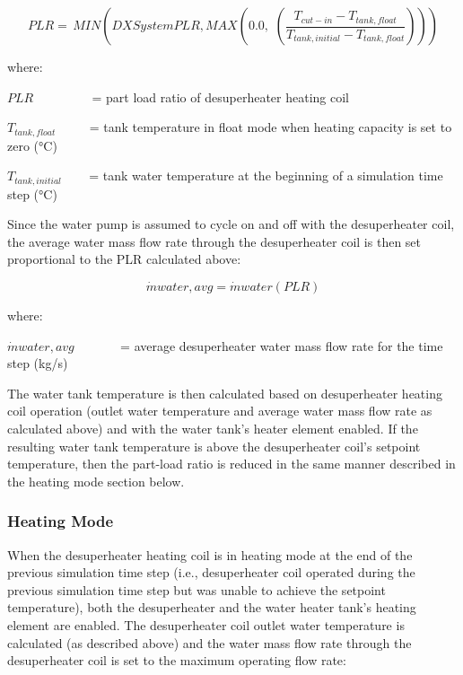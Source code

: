 \begin{equation}
PLR = \,MIN\left( {DXSystemPLR,MAX\left( {0.0,\,\,\left( {\frac{{{T_{cut - in}} - {T_{tank,float}}}}{{{T_{tank,initial}} - {T_{tank,float}}}}} \right)} \right)} \right)
\end{equation}

where:

\(PLR\) ~~~~~~~~ = part load ratio of desuperheater heating coil

\({T_{tank,float}}\) ~~~~ = tank temperature in float mode when heating capacity is set to zero (°C)

\({T_{tank,initial}}\) ~~~ = tank water temperature at the beginning of a simulation time step (°C)

Since the water pump is assumed to cycle on and off with the desuperheater coil, the average water mass flow rate through the desuperheater coil is then set proportional to the PLR calculated above:

\begin{equation}
\dot mwater,avg = \dot mwater\left( {PLR} \right)
\end{equation}

where:

\(\dot mwater,avg\) ~~~~~~ = average desuperheater water mass flow rate for the time step (kg/s)

The water tank temperature is then calculated based on desuperheater heating coil operation (outlet water temperature and average water mass flow rate as calculated above) and with the water tank's heater element enabled. If the resulting water tank temperature is above the desuperheater coil's setpoint temperature, then the part-load ratio is reduced in the same manner described in the heating mode section below.

\subsubsection{Heating Mode}\label{heating-mode}

When the desuperheater heating coil is in heating mode at the end of the previous simulation time step (i.e., desuperheater coil operated during the previous simulation time step but was unable to achieve the setpoint temperature), both the desuperheater and the water heater tank's heating element are enabled. The desuperheater coil outlet water temperature is calculated (as described above) and the water mass flow rate through the desuperheater coil is set to the maximum operating flow rate:

